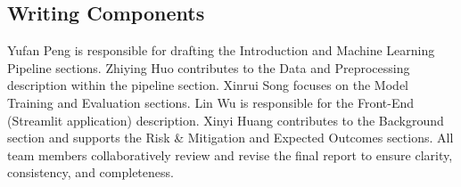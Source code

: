 \subsection{Writing Components}

Yufan Peng is responsible for drafting the Introduction and Machine Learning Pipeline sections. Zhiying Huo contributes to the Data and Preprocessing description within the pipeline section. Xinrui Song focuses on the Model Training and Evaluation sections. Lin Wu is responsible for the Front-End (Streamlit application) description. Xinyi Huang contributes to the Background section and supports the Risk \& Mitigation and Expected Outcomes sections. All team members collaboratively review and revise the final report to ensure clarity, consistency, and completeness.



